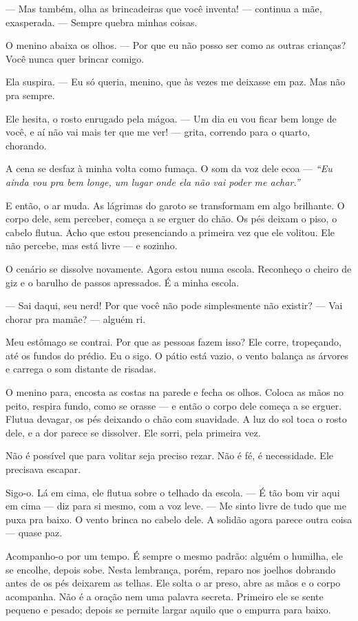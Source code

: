 — Mas também, olha as brincadeiras que você inventa! — continua a mãe, exasperada. — Sempre quebra minhas coisas.

O menino abaixa os olhos.  
— Por que eu não posso ser como as outras crianças? Você nunca quer brincar comigo.

Ela suspira.  
— Eu só queria, menino, que às vezes me deixasse em paz. Mas não pra sempre.  

Ele hesita, o rosto enrugado pela mágoa.  
— Um dia eu vou ficar bem longe de você, e aí não vai mais ter que me ver! — grita, correndo para o quarto, chorando.

A cena se desfaz à minha volta como fumaça.
O som da voz dele ecoa — \emph{“Eu ainda vou pra bem longe, um lugar onde ela não vai poder me achar.”}

E então, o ar muda.  
As lágrimas do garoto se transformam em algo brilhante.  
O corpo dele, sem perceber, começa a se erguer do chão.  
Os pés deixam o piso, o cabelo flutua.  
Acho que estou presenciando a primeira vez que ele volitou.  
Ele não percebe, mas está livre — e sozinho.

O cenário se dissolve novamente.  
Agora estou numa escola. Reconheço o cheiro de giz e o barulho de passos apressados. É a minha escola.  

— Sai daqui, seu nerd! Por que você não pode simplesmente não existir?  
— Vai chorar pra mamãe? — alguém ri.

Meu estômago se contrai.  
Por que as pessoas fazem isso?  
Ele corre, tropeçando, até os fundos do prédio. Eu o sigo.  
O pátio está vazio, o vento balança as árvores e carrega o som distante de risadas.  

O menino para, encosta as costas na parede e fecha os olhos.  
Coloca as mãos no peito, respira fundo, como se orasse — e então o corpo dele começa a se erguer.  
Flutua devagar, os pés deixando o chão com suavidade.  
A luz do sol toca o rosto dele, e a dor parece se dissolver.  
Ele sorri, pela primeira vez.

Não é possível que para volitar seja preciso rezar.  
Não é fé, é necessidade.  
Ele precisava escapar.  

Sigo-o.  
Lá em cima, ele flutua sobre o telhado da escola.  
— É tão bom vir aqui em cima — diz para si mesmo, com a voz leve. — Me sinto livre de tudo que me puxa pra baixo.  
O vento brinca no cabelo dele.  
A solidão agora parece outra coisa — quase paz.

Acompanho-o por um tempo.  
É sempre o mesmo padrão: alguém o humilha, ele se encolhe, depois sobe. Nesta lembrança, porém, reparo nos joelhos dobrando antes de os pés deixarem as telhas. Ele solta o ar preso, abre as mãos e o corpo acompanha. Não é a oração nem uma palavra secreta. Primeiro ele se sente pequeno e pesado; depois se permite largar aquilo que o empurra para baixo.

